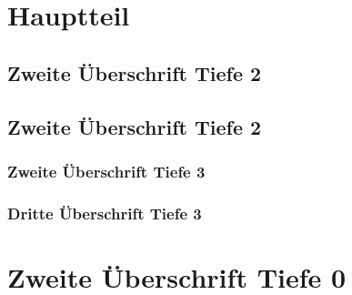 \chapter{Hauptteil}
\lipsum

\section{Zweite Überschrift Tiefe 2}
\lipsum  

\section{Zweite Überschrift Tiefe 2}
\lipsum 

\subsection{Zweite Überschrift Tiefe 3}
\lipsum 

\subsection{Dritte Überschrift Tiefe 3}
\lipsum 
    
\chapter{Zweite Überschrift Tiefe 0}
\lipsum 
